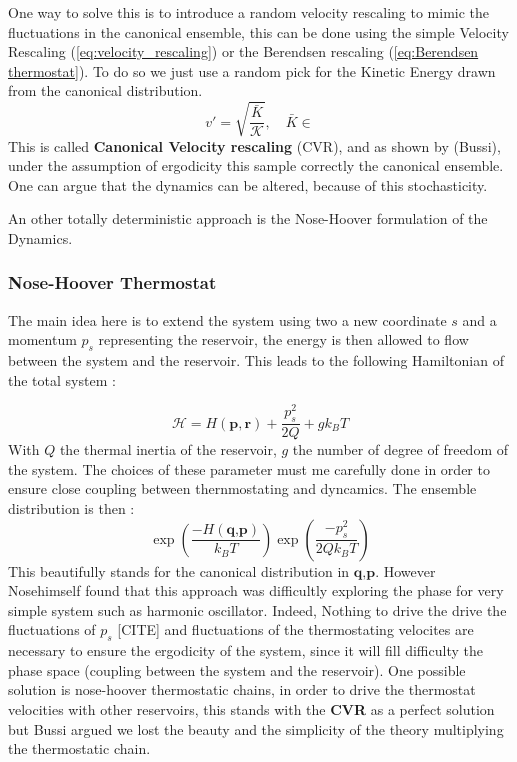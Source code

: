 \documentclass[ansiapaper]{report}
\begin{document}
\begin{multicols}{3}
One way to solve this is to introduce a random velocity rescaling to mimic the fluctuations in the canonical ensemble, this can be done using the simple Velocity Rescaling (\ref{eq:velocity_rescaling}) or the Berendsen rescaling (\ref{eq:Berendsen thermostat}). To do so we just use a random pick for the Kinetic Energy drawn from the canonical distribution. 
$$ v' = \sqrt{\frac{\bar{K}}{\mathcal{K}}}, \quad \bar{K} \in $$
This is called \textbf{Canonical Velocity rescaling} (CVR), and as shown by (Bussi), under the assumption of ergodicity this sample correctly the canonical ensemble. One can argue that the dynamics can be altered, because of this stochasticity. 

An other totally deterministic approach is the Nose-Hoover formulation of the Dynamics.

\subsubsection{Nose-Hoover Thermostat}
The main idea here is to extend the system using two a new coordinate $s$ and a momentum $p_s$ representing the reservoir, the energy is then allowed to flow between the system and the reservoir. This leads to the following Hamiltonian of the total system :

$$\mathcal{H} = H(\textbf{p}, \textbf{r}) + \frac{p_s^2}{2Q} + gk_BT$$
With $Q$ the thermal inertia of the reservoir, $g$ the number of degree of freedom of the system. The choices of these parameter must me carefully done in order to ensure close coupling between thernmostating and dyncamics. The ensemble distribution is then :
$$\exp(\frac{-H(\textbf{q,p})}{k_BT}) \exp(\frac{-p_s^2}{2Qk_BT})$$
This beautifully stands for the canonical distribution in $\textbf{q,p}$. However Nosehimself found that this approach was difficultly exploring the phase for very simple system such as harmonic oscillator. Indeed, 
Nothing to drive the drive the fluctuations of $p_s$ [CITE] and fluctuations of the thermostating velocites are necessary to ensure the ergodicity of the system, since it will fill difficulty the phase space (coupling between the system and the reservoir). 
One possible solution is nose-hoover thermostatic chains, in order to drive the thermostat velocities with other reservoirs, this stands with the \textbf{CVR} as a perfect solution but Bussi argued we lost the beauty and the simplicity of the theory multiplying the thermostatic chain.


\end{multicols}
\end{document}
